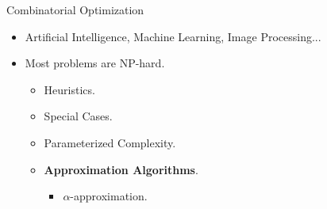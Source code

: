 \begin{frame}{Combinatorial Optimization}
\begin{itemize}[<+->]
  \item Artificial Intelligence, Machine Learning, Image Processing...
  \item Most problems are NP-hard.
	\begin{itemize}[<+->]
	  \item Heuristics.
	  \item Special Cases.
	  \item Parameterized Complexity.
	  \item \textbf{Approximation Algorithms}.
		\begin{itemize}[<+->]
			\item $\alpha$-approximation.
		\end{itemize}
	\end{itemize}
\end{itemize}
\end{frame}